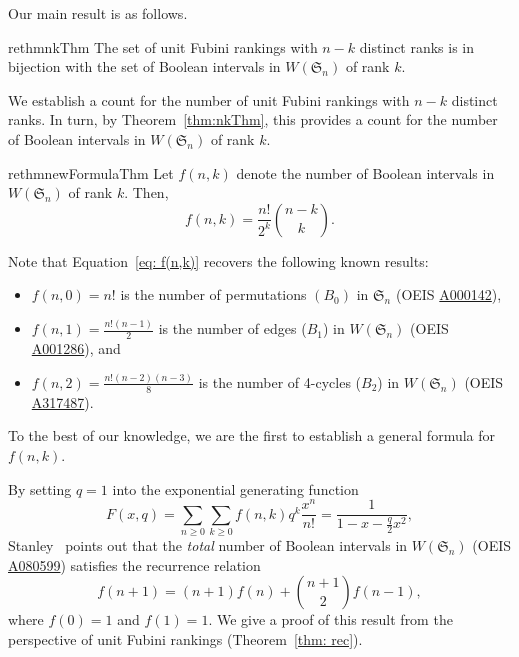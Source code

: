 \documentclass[11pt,reqno]{amsart}
\theoremstyle{definition}
\theoremstyle{notation}
\theoremstyle{openproblem}
\newcommand{\Sym}{\mathfrak{S}}
\begin{document}
Our main result is as follows. 
\begin{restatable}{rethm}{nkThm}
\label{thm:nkThm}
The set of unit Fubini rankings with $n-k$ distinct ranks is in bijection with the set of Boolean intervals in $W(\Sym_n)$ of rank $k$.
\end{restatable}

We establish a count for the number of unit Fubini rankings with $n-k$ distinct ranks.
In turn, by Theorem~\ref{thm:nkThm}, this provides a count for the number of Boolean intervals in $W(\Sym_n)$ of rank $k$.
\begin{restatable}{rethm}{newFormulaThm}
\label{newFormulaThm}
Let $f(n,k)$ denote the number of Boolean intervals in $W(\Sym_n)$ of rank $k$.
Then,
\begin{equation}
\label{eq: f(n,k)}
    f(n,k) = \frac{n!}{2^k}\binom{n-k}{k}.
\end{equation}
\end{restatable}
Note that Equation~\eqref{eq: f(n,k)} recovers the following known results:
\begin{itemize}
    \item $f(n,0)=n!$ is the number of permutations $(B_0)$ in $\Sym_n$ (OEIS \href{https://oeis.org/A000142}{A000142}), 
    \item $f(n,1)=\frac{n!(n-1)}{2}$ is the number of edges ($B_1$) in $W(\Sym_n)$ (OEIS \href{https://oeis.org/A001286}{A001286}),  and 
    \item $f(n,2)=\frac{n!(n-2)(n-3)}{8}$ is the number of 4-cycles ($B_2$) in $W(\Sym_n)$ (OEIS \href{https://oeis.org/A317487}{A317487}).
\end{itemize}  
To the best of our knowledge, we are the first to establish a general formula for $f(n,k)$.

By setting $q=1$ into the exponential generating function \cite[Exercise~3.185(h)]{StanleyECVol1}
\begin{equation}
    F(x,q) 
    = \sum_{n\geq 0} \sum_{k\geq 0} f(n,k)q^k\frac{x^n}{n!} 
    = \frac{1}{1-x-\frac{q}{2}x^2},
\end{equation}
Stanley~\cite{StanleyMath} points out that the \emph{total} number of Boolean intervals in $W(\Sym_n)$ (OEIS \href{https://oeis.org/A080599}{A080599}) satisfies the recurrence relation  
\begin{equation}
    f(n+1) = (n+1)f(n)+\binom{n+1}{2}f(n-1),
\end{equation}
where $f(0)=1$ and $f(1)=1$. 
We give a proof of this result from the perspective of unit Fubini rankings (Theorem~\ref{thm: rec}). 
\end{document}
